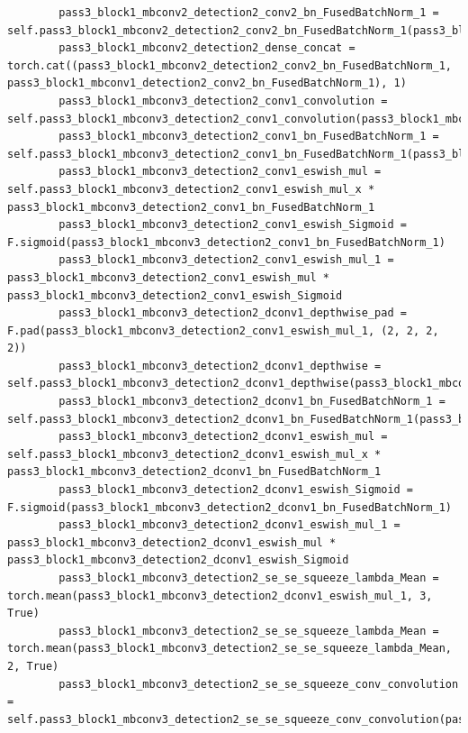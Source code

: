 \documentclass{fisatprojectfinal}
\begin{document}
\begin{appendices}
\begin{lstlisting}
        pass3_block1_mbconv2_detection2_conv2_bn_FusedBatchNorm_1 = self.pass3_block1_mbconv2_detection2_conv2_bn_FusedBatchNorm_1(pass3_block1_mbconv2_detection2_conv2_convolution)
        pass3_block1_mbconv2_detection2_dense_concat = torch.cat((pass3_block1_mbconv2_detection2_conv2_bn_FusedBatchNorm_1, pass3_block1_mbconv1_detection2_conv2_bn_FusedBatchNorm_1), 1)
        pass3_block1_mbconv3_detection2_conv1_convolution = self.pass3_block1_mbconv3_detection2_conv1_convolution(pass3_block1_mbconv2_detection2_dense_concat)
        pass3_block1_mbconv3_detection2_conv1_bn_FusedBatchNorm_1 = self.pass3_block1_mbconv3_detection2_conv1_bn_FusedBatchNorm_1(pass3_block1_mbconv3_detection2_conv1_convolution)
        pass3_block1_mbconv3_detection2_conv1_eswish_mul = self.pass3_block1_mbconv3_detection2_conv1_eswish_mul_x * pass3_block1_mbconv3_detection2_conv1_bn_FusedBatchNorm_1
        pass3_block1_mbconv3_detection2_conv1_eswish_Sigmoid = F.sigmoid(pass3_block1_mbconv3_detection2_conv1_bn_FusedBatchNorm_1)
        pass3_block1_mbconv3_detection2_conv1_eswish_mul_1 = pass3_block1_mbconv3_detection2_conv1_eswish_mul * pass3_block1_mbconv3_detection2_conv1_eswish_Sigmoid
        pass3_block1_mbconv3_detection2_dconv1_depthwise_pad = F.pad(pass3_block1_mbconv3_detection2_conv1_eswish_mul_1, (2, 2, 2, 2))
        pass3_block1_mbconv3_detection2_dconv1_depthwise = self.pass3_block1_mbconv3_detection2_dconv1_depthwise(pass3_block1_mbconv3_detection2_dconv1_depthwise_pad)
        pass3_block1_mbconv3_detection2_dconv1_bn_FusedBatchNorm_1 = self.pass3_block1_mbconv3_detection2_dconv1_bn_FusedBatchNorm_1(pass3_block1_mbconv3_detection2_dconv1_depthwise)
        pass3_block1_mbconv3_detection2_dconv1_eswish_mul = self.pass3_block1_mbconv3_detection2_dconv1_eswish_mul_x * pass3_block1_mbconv3_detection2_dconv1_bn_FusedBatchNorm_1
        pass3_block1_mbconv3_detection2_dconv1_eswish_Sigmoid = F.sigmoid(pass3_block1_mbconv3_detection2_dconv1_bn_FusedBatchNorm_1)
        pass3_block1_mbconv3_detection2_dconv1_eswish_mul_1 = pass3_block1_mbconv3_detection2_dconv1_eswish_mul * pass3_block1_mbconv3_detection2_dconv1_eswish_Sigmoid
        pass3_block1_mbconv3_detection2_se_se_squeeze_lambda_Mean = torch.mean(pass3_block1_mbconv3_detection2_dconv1_eswish_mul_1, 3, True)
        pass3_block1_mbconv3_detection2_se_se_squeeze_lambda_Mean = torch.mean(pass3_block1_mbconv3_detection2_se_se_squeeze_lambda_Mean, 2, True)
        pass3_block1_mbconv3_detection2_se_se_squeeze_conv_convolution = self.pass3_block1_mbconv3_detection2_se_se_squeeze_conv_convolution(pass3_block1_mbconv3_detection2_se_se_squeeze_lambda_Mean)

\end{lstlisting}
\end{appendices}
\end{document}
